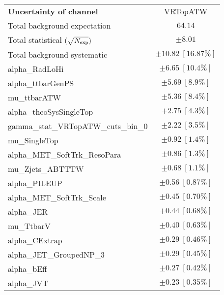 
\begin{table}
\begin{center}
\setlength{\tabcolsep}{0.0pc}
\begin{tabular*}{\textwidth}{@{\extracolsep{\fill}}lc}
\noalign{\smallskip}\hline\noalign{\smallskip}
{\bf Uncertainty of channel}                                    & VRTopATW            \\
\noalign{\smallskip}\hline\noalign{\smallskip}
Total background expectation             &  $64.14$       \\
\noalign{\smallskip}\hline\noalign{\smallskip}
Total statistical $(\sqrt{N_{\rm exp}})$              & $\pm 8.01$       \\
Total background systematic               & $\pm 10.82\ [16.87\%] $             \\
\noalign{\smallskip}\hline\noalign{\smallskip}
\noalign{\smallskip}\hline\noalign{\smallskip}
alpha\_RadLoHi         & $\pm 6.65\ [10.4\%] $       \\
alpha\_ttbarGenPS         & $\pm 5.69\ [8.9\%] $       \\
mu\_ttbarATW         & $\pm 5.36\ [8.4\%] $       \\
alpha\_theoSysSingleTop         & $\pm 2.75\ [4.3\%] $       \\
gamma\_stat\_VRTopATW\_cuts\_bin\_0         & $\pm 2.22\ [3.5\%] $       \\
mu\_SingleTop         & $\pm 0.92\ [1.4\%] $       \\
alpha\_MET\_SoftTrk\_ResoPara         & $\pm 0.86\ [1.3\%] $       \\
mu\_Zjets\_ABTTTW         & $\pm 0.68\ [1.1\%] $       \\
alpha\_PILEUP         & $\pm 0.56\ [0.87\%] $       \\
alpha\_MET\_SoftTrk\_Scale         & $\pm 0.45\ [0.70\%] $       \\
alpha\_JER         & $\pm 0.44\ [0.68\%] $       \\
mu\_TtbarV         & $\pm 0.40\ [0.63\%] $       \\
alpha\_CExtrap         & $\pm 0.29\ [0.46\%] $       \\
alpha\_JET\_GroupedNP\_3         & $\pm 0.29\ [0.45\%] $       \\
alpha\_bEff         & $\pm 0.27\ [0.42\%] $       \\
alpha\_JVT         & $\pm 0.23\ [0.35\%] $       \\

\end{tabular*}
\end{center}
\end{table}
